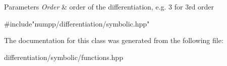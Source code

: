 \begin{DoxyParams}{Parameters}
{\em Order} & order of the differentiation, e.\+g. 3 for 3rd order\\
\hline
\end{DoxyParams}

\begin{DoxyCode}
\textcolor{preprocessor}{#include"numpp/differentiation/symbolic.hpp"}
\end{DoxyCode}
 

The documentation for this class was generated from the following file\+:\begin{DoxyCompactItemize}
\item 
differentiation/symbolic/functions.\+hpp\end{DoxyCompactItemize}
